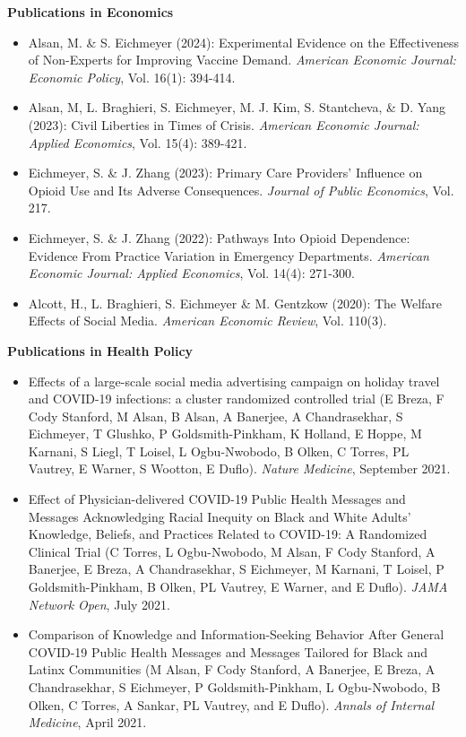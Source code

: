 \documentclass[letterpaper,11pt]{article}
\begin{document}
\begin{normalsize}
\vspace{-0.4cm} 
\textbf{Publications in Economics}
\medskip

\setlength{\parindent}{0pt}
\setlength{\parskip}{0em}

\begin{itemize}[leftmargin=*]
\itemsep0em 
\item Alsan, M. \& S. Eichmeyer (2024): Experimental Evidence on the Effectiveness of Non-Experts for Improving Vaccine Demand. \textit{American Economic Journal: Economic Policy}, Vol. 16(1): 394-414.
\item Alsan, M, L. Braghieri, S. Eichmeyer, M. J. Kim, S. Stantcheva, \& D. Yang (2023): Civil Liberties in Times of Crisis. \textit{American Economic Journal: Applied Economics}, Vol. 15(4): 389-421.
\item Eichmeyer, S. \& J. Zhang (2023): Primary Care Providers’ Influence on Opioid Use and Its Adverse Consequences. \textit{Journal of Public Economics}, Vol. 217.
\item Eichmeyer, S. \& J. Zhang (2022): Pathways Into Opioid Dependence: Evidence From Practice Variation in Emergency Departments. \textit{American Economic Journal: Applied Economics}, Vol. 14(4): 271-300.
\item Alcott, H., L. Braghieri, S. Eichmeyer \& M. Gentzkow (2020): The Welfare Effects of Social Media. \textit{American Economic Review}, Vol. 110(3). 
\end{itemize}
\bigskip

\textbf{Publications in Health Policy} 
\medskip
\begin{itemize}[leftmargin=*]
\itemsep0em 
\item Effects of a large-scale social media advertising campaign on holiday travel and COVID-19 infections: a cluster randomized controlled trial (E Breza, F Cody Stanford, M Alsan, B Alsan, A Banerjee, A Chandrasekhar, S Eichmeyer, T Glushko, P Goldsmith-Pinkham, K Holland, E Hoppe, M Karnani, S Liegl, T Loisel, L Ogbu-Nwobodo, B Olken, C Torres, PL Vautrey, E Warner, S Wootton, E Duflo).  \textit{Nature Medicine}, September 2021.
\item Effect of Physician-delivered COVID-19 Public Health Messages and Messages Acknowledging Racial Inequity on Black and White Adults' Knowledge, Beliefs, and Practices Related to COVID-19: A Randomized Clinical Trial (C Torres, L Ogbu-Nwobodo, M Alsan, F Cody Stanford, A Banerjee, E Breza, A Chandrasekhar, S Eichmeyer, M Karnani, T Loisel, P Goldsmith-Pinkham, B Olken, PL Vautrey, E Warner, and E Duflo).   \textit{JAMA Network Open}, July 2021. 
\item Comparison of Knowledge and Information-Seeking Behavior After General COVID-19 Public Health Messages and Messages Tailored for Black and Latinx Communities (M Alsan, F Cody Stanford, A Banerjee, E Breza, A Chandrasekhar, S Eichmeyer, P Goldsmith-Pinkham, L Ogbu-Nwobodo, B Olken, C Torres, A Sankar, PL Vautrey, and E Duflo).  \textit{Annals of Internal Medicine}, April 2021. 
\end{itemize}


\end{normalsize}
\end{document}

